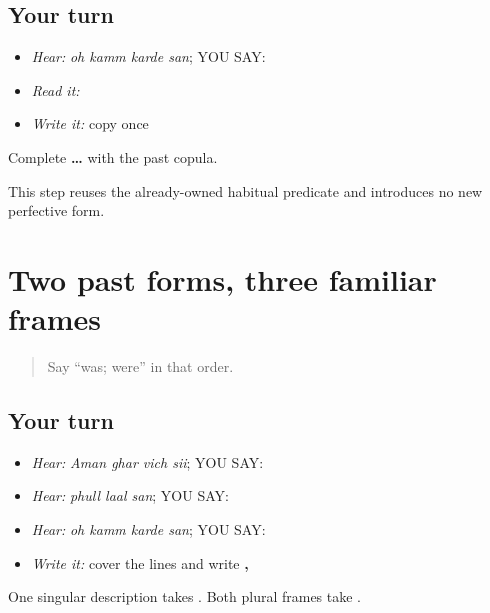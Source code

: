 \subsection*{Your turn}
\begin{itemize}
\raggedright
  \item \emph{Hear:} \emph{oh kamm karde san}; YOU SAY: \textbf{   }
  \item \emph{Read it:} \textbf{   }
  \item \emph{Write it:} copy \textbf{ } once
\end{itemize}

\begin{tcolorbox}[breakable,colback=teal!4,colframe=teal!35!black,title={Before you move on}]
Complete \textbf{   …} with the past copula.

This step reuses the already-owned habitual predicate and introduces no new perfective form.
\end{tcolorbox}
\section[\texorpdfstring{\pa{ਸੀ} · \pa{ਸਨ} (sii / san)}{ਸੀ · ਸਨ (sii / san)}]{Two past forms, three familiar frames}

\label{lesson:PA-C187-san-review}



\begin{quote}
Say “was; were” in that order.
\end{quote}

\subsection*{Your turn}
\begin{itemize}
\raggedright
  \item \emph{Hear:} \emph{Aman ghar vich sii}; YOU SAY: \textbf{   }
  \item \emph{Hear:} \emph{phull laal san}; YOU SAY: \textbf{  }
  \item \emph{Hear:} \emph{oh kamm karde san}; YOU SAY: \textbf{   }
  \item \emph{Write it:} cover the lines and write \textbf{, }
\end{itemize}

One singular description takes \textbf{}. Both plural frames take \textbf{}.

